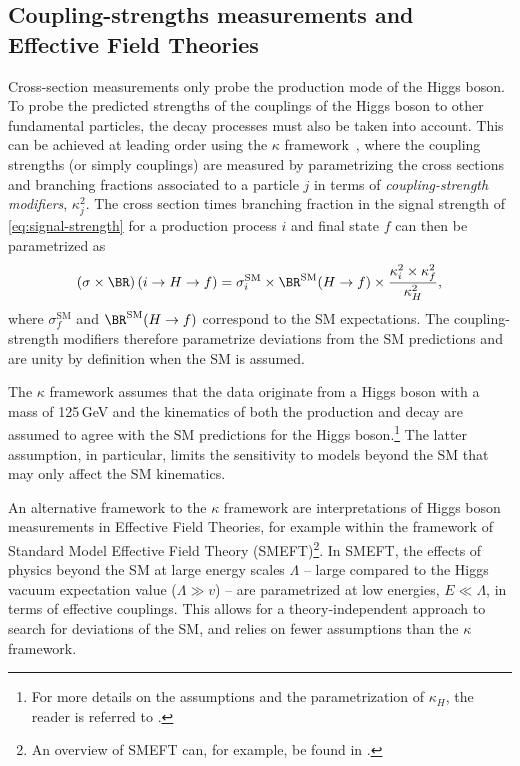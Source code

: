 \subsection{Coupling-strengths measurements and Effective Field Theories}
\label{subsec:coupling-measurements}
Cross-section measurements only probe the production mode of the Higgs boson.
To probe the predicted strengths of the couplings of the Higgs boson to other fundamental particles, the decay processes must also be taken into account.
This can be achieved at leading order using the $\kappa$ framework~\cite{LHCHandbookV3}, where the coupling strengths (or simply couplings) are measured by parametrizing the cross sections and branching fractions associated to a particle $j$ in terms of \emph{coupling-strength modifiers}, $\kappa_j^2$.
The cross section times branching fraction in the signal strength of \cref{eq:signal-strength} for a production process $i$ and final state $f$ can then be parametrized as
\begin{equation}
  \label{eq:kappa-parametrization}
  \left( \sigma \times  \BR \right) (i \to H \to f)  =  \sigma_{i}^\mathrm{SM} \times \BR^\mathrm{SM}(H \to f) \times \frac{\kappa_i^2 \times  \kappa_f^2}{\kappa_H^2}, 
\end{equation}
where $\sigma_{f}^\mathrm{SM}$ and $\BR^\mathrm{SM}(H \to f)$ correspond to the SM expectations. 
The coupling-strength modifiers therefore parametrize deviations from the SM predictions and are unity by definition when the SM is assumed.

The $\kappa$ framework assumes that the data originate from a Higgs boson with a mass of 125\,GeV and the kinematics of both the production and decay are assumed to agree with the SM predictions for the Higgs boson.\footnote{For more details on the assumptions and the parametrization of $\kappa_H$, the reader is referred to .}
The latter assumption, in particular, limits the sensitivity to models beyond the SM that may only affect the SM kinematics. 

An alternative framework to the $\kappa$ framework are interpretations of Higgs boson measurements in Effective Field Theories, for example within the framework of Standard Model Effective Field Theory (SMEFT)\footnote{An overview of SMEFT can, for example, be found in .}.
In SMEFT, the effects of physics beyond the SM at large energy scales $\Lambda$ -- large compared to the Higgs vacuum expectation value ($\Lambda \gg v$) -- are parametrized at low energies, $E \ll \Lambda$, in terms of effective couplings. 
This allows for a theory-independent approach to search for deviations of the SM, and relies on fewer assumptions than the $\kappa$ framework. 

